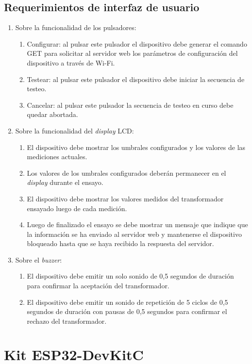 \subsection{Requerimientos de interfaz de usuario}
\label{subsec:ReqUsu}
	\begin{enumerate}
	\item Sobre la funcionalidad de los pulsadores:
		\begin{enumerate}
		\item Configurar: al pulsar este pulsador el dispositivo debe generar el comando GET para solicitar al servidor web los parámetros de configuración del dispositivo a través de Wi-Fi.
		\item Testear: al pulsar este pulsador el dispositivo debe iniciar la secuencia de testeo.
		\item Cancelar: al pulsar este pulsador la secuencia de testeo en curso debe quedar abortada.
		\end{enumerate}
	\item Sobre la funcionalidad del \textit{display} LCD:
		\begin{enumerate}
		\item El dispositivo debe mostrar los umbrales configurados y los valores de las mediciones actuales.
		\item Los valores de los umbrales configurados deberán permanecer en el \textit{display} durante el ensayo.
		\item El dispositivo debe mostrar los valores medidos del transformador ensayado luego de cada medición.
		\item Luego de finalizado el ensayo se debe mostrar un mensaje que indique que la información se ha enviado al servidor web y mantenerse el dispositivo bloqueado hasta que se haya recibido la respuesta del servidor.
		\end{enumerate}
	\item Sobre el \textit{buzzer}:
		\begin{enumerate}
		\item El dispositivo debe emitir un solo sonido de 0,5 segundos de duración para confirmar la aceptación del transformador.
		\item El dispositivo debe emitir un sonido de repetición de 5 ciclos de 0,5 segundos de duración con pausas de 0,5 segundos para confirmar el rechazo del transformador.
		\end{enumerate}		
	\end{enumerate}


\section{Kit ESP32-DevKitC}

